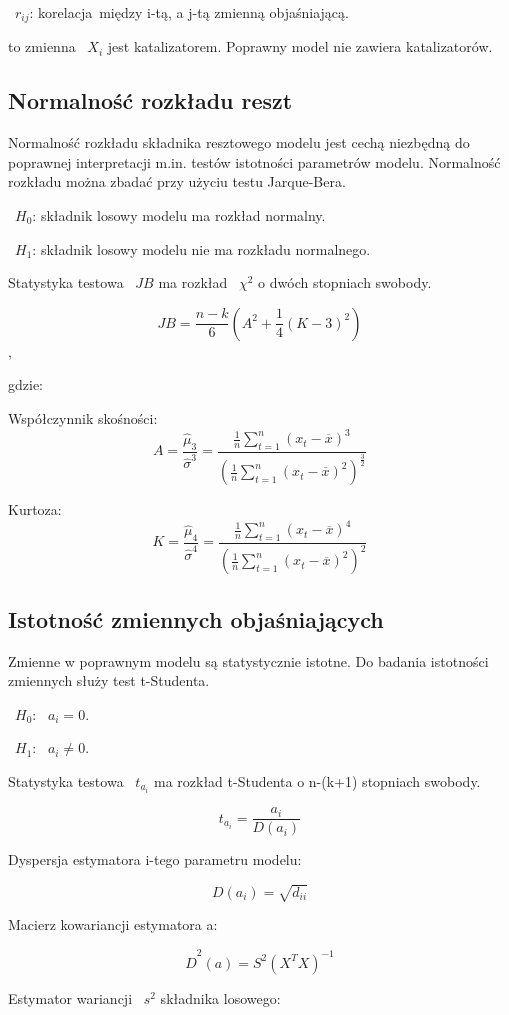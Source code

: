 \documentclass{article}
\begin{document}
~$r_{ij}$: korelacja między i-tą, a j-tą zmienną objaśniającą.

to zmienna ~$X_i$ jest katalizatorem. Poprawny model nie zawiera katalizatorów.

\newpage
\subsection{Normalność rozkładu reszt}
Normalność rozkładu składnika resztowego modelu jest cechą niezbędną do poprawnej interpretacji m.in. testów istotności parametrów modelu. Normalność rozkładu można zbadać przy użyciu testu Jarque-Bera.

~$H_0$: składnik losowy modelu ma rozkład normalny.

~$H_1$: składnik losowy modelu nie ma rozkładu normalnego.

Statystyka testowa ~$JB$ ma rozkład ~$\chi^2$ o dwóch stopniach swobody.

\[JB=\frac{n-k}{6}(A^2+\frac{1}{4}(K-3)^2)\],

gdzie:

Współczynnik skośności:
\[A = \frac{\hat{\mu}_3}{\hat{\sigma}^3} = 
\frac{\frac{1}{n} \sum_{t=1}^{n} ( x_t - \overline{x} )^3}
{(\frac{1}{n} \sum_{t=1}^{n} ( x_t - \overline{x} )^2)^{\frac{3}{2}}}
\]

Kurtoza:
\[K = \frac{\hat{\mu}_4}{\hat{\sigma}^4} = 
\frac{\frac{1}{n} \sum_{t=1}^{n} ( x_t - \overline{x} )^4}
{(\frac{1}{n} \sum_{t=1}^{n} ( x_t - \overline{x} )^2)^{2}}
\]

\subsection{Istotność zmiennych objaśniających}
Zmienne w poprawnym modelu są statystycznie istotne. Do badania istotności zmiennych służy test t-Studenta.

~$H_0$: ~$a_i = 0$.

~$H_1$: ~$a_i \neq 0$.

Statystyka testowa ~$t_{a_i}$ ma rozkład t-Studenta o n-(k+1) stopniach swobody.

\[t_{a_i} = \frac{a_i}{D(a_i)}\]

Dyspersja estymatora i-tego parametru modelu:

\[D(a_i)=\sqrt{d_{ii}}\]

Macierz kowariancji estymatora a:

\[\hat{D}^2(a)=S^2(X^TX)^{-1}\]

Estymator wariancji ~$s^2$ składnika losowego:
\end{document}
